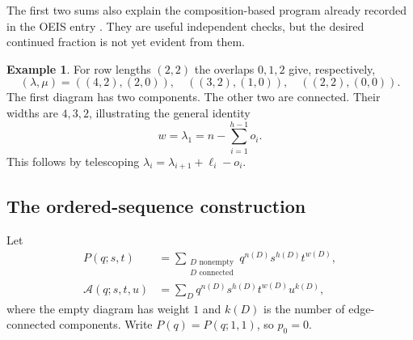 \documentclass[11pt,letterpaper]{article}
\numberwithin{equation}{section}
\theoremstyle{definition}
\newtheorem{example}[theorem]{Example}
\newcommand{\Aall}{\mathcal A}
\begin{document}
The first two sums also explain the composition-based program already
recorded in the OEIS entry \cite{oeis225114}. They are useful independent
checks, but the desired continued fraction is not yet evident from them.

\begin{example}
For row lengths $(2,2)$ the overlaps $0,1,2$ give, respectively,
\[
 (\lambda,\mu)=((4,2),(2,0)),\quad
 ((3,2),(1,0)),\quad ((2,2),(0,0)).
\]
The first diagram has two components. The other two are connected. Their
widths are $4,3,2$, illustrating the general identity
\begin{equation}
 w=\lambda_1=n-\sum_{i=1}^{h-1}o_i.
 \label{eq:widthoverlap}
\end{equation}
This follows by telescoping
$\lambda_i=\lambda_{i+1}+\ell_i-o_i$.
\end{example}

\subsection{The ordered-sequence construction}
Let
\begin{align}
 P(q;s,t)&=\sum_{\substack{D\text{ nonempty}\\D\text{ connected}}}
               q^{n(D)}s^{h(D)}t^{w(D)},\label{eq:connectedrefined}\\
 \Aall(q;s,t,u)&=\sum_D q^{n(D)}s^{h(D)}t^{w(D)}u^{k(D)},
 \label{eq:allrefined}
\end{align}
where the empty diagram has weight $1$ and $k(D)$ is the number of
edge-connected components. Write $P(q)=P(q;1,1)$, so $p_0=0$.
\end{document}
